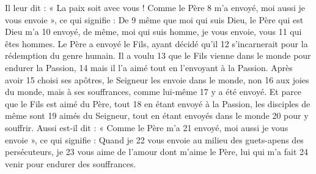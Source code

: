 Il leur dit : « La paix soit avec vous ! Comme le Père	 
8	 	m'a envoyé, moi aussi je vous envoie », ce qui signifie : De	 
9	 	même que moi qui suis Dieu, le Père qui est Dieu m'a	 
10	 	envoyé, de même, moi qui suis homme, je vous envoie, vous	 
11	 	qui êtes hommes. Le Père a envoyé le Fils, ayant décidé qu'il	 
12	 	s'incarnerait pour la rédemption du genre humain. Il a voulu	 
13	 	que le Fils vienne dans le monde pour endurer la Passion,	 
14	 	mais il l'a aimé tout en l'envoyant à la Passion. Après avoir	 
15	 	choisi ses apôtres, le Seigneur les envoie dans le monde, non	 
16	 	aux joies du monde, mais à ses souffrances, comme lui-même	 
17	 	y a été envoyé. Et parce que le Fils est aimé du Père, tout	 
18	 	en étant envoyé à la Passion, les disciples de même sont	 
19	 	aimés du Seigneur, tout en étant envoyés dans le monde	 
20	 	pour y souffrir. Aussi est-il dit : « Comme le Père m'a	 
21	 	envoyé, moi aussi je vous envoie », ce qui signifie : Quand je	 
22	 	vous envoie au milieu des guets-apens des persécuteurs, je	 
23	 	vous aime de l'amour dont m'aime le Père, lui qui m'a fait	 
24	 	venir pour endurer des souffrances.
